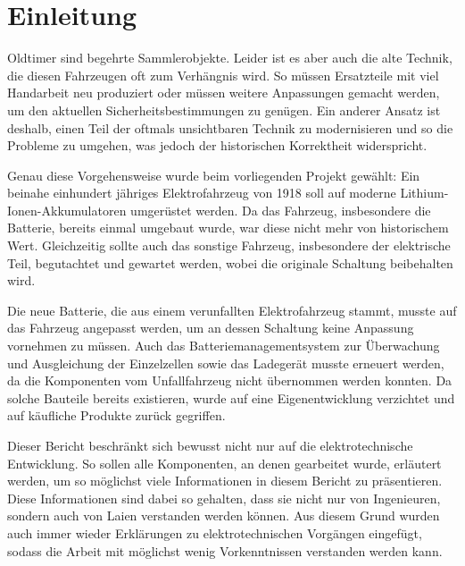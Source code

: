 \chapter{Einleitung}

Oldtimer sind begehrte Sammlerobjekte. Leider ist es aber auch die alte Technik, die diesen Fahrzeugen oft zum Verhängnis wird. So müssen Ersatzteile mit viel Handarbeit neu produziert oder müssen weitere Anpassungen gemacht werden, um den aktuellen Sicherheitsbestimmungen zu genügen. Ein anderer Ansatz ist deshalb, einen Teil der oftmals unsichtbaren Technik zu modernisieren und so die Probleme zu umgehen, was jedoch der historischen Korrektheit widerspricht.

Genau diese Vorgehensweise wurde beim vorliegenden Projekt gewählt: Ein beinahe einhundert jähriges Elektrofahrzeug von 1918 soll auf moderne Lithium-Ionen-Akkumulatoren umgerüstet werden. Da das Fahrzeug, insbesondere die Batterie, bereits einmal umgebaut wurde, war diese nicht mehr von historischem Wert. Gleichzeitig sollte auch das sonstige Fahrzeug, insbesondere der elektrische Teil, begutachtet und gewartet werden, wobei die originale Schaltung beibehalten wird.

Die neue Batterie, die aus einem verunfallten Elektrofahrzeug stammt, musste auf das Fahrzeug angepasst werden, um an dessen Schaltung keine Anpassung vornehmen zu müssen. Auch das Batteriemanagementsystem zur Überwachung und Ausgleichung der Einzelzellen sowie das Ladegerät musste erneuert werden, da die Komponenten vom Unfallfahrzeug nicht übernommen werden konnten. Da solche Bauteile bereits existieren, wurde auf eine Eigenentwicklung verzichtet und auf käufliche Produkte zurück gegriffen.

Dieser Bericht beschränkt sich bewusst nicht nur auf die elektrotechnische Entwicklung. So sollen alle Komponenten, an denen gearbeitet wurde, erläutert werden, um so möglichst viele Informationen in diesem Bericht zu präsentieren. Diese Informationen sind dabei so gehalten, dass sie nicht nur von Ingenieuren, sondern auch von Laien verstanden werden können. Aus diesem Grund wurden auch immer wieder Erklärungen zu elektrotechnischen Vorgängen eingefügt, sodass die Arbeit mit möglichst wenig Vorkenntnissen verstanden werden kann.